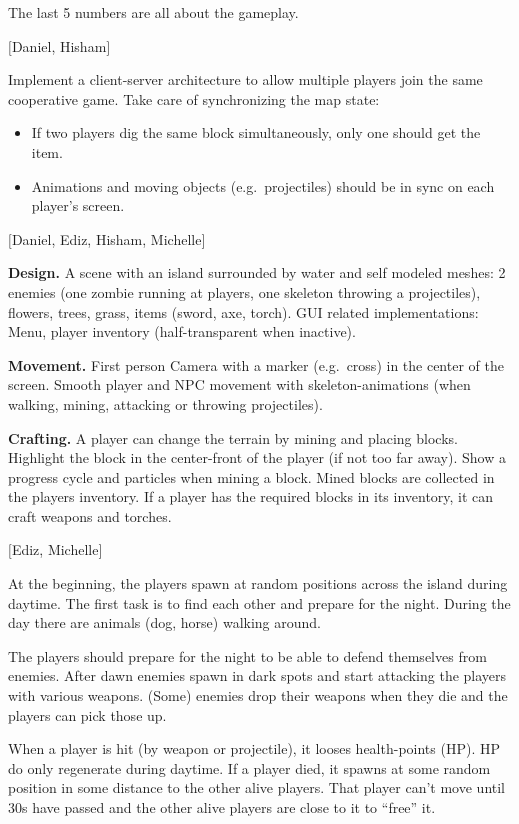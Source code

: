 \documentclass[A4paper]{gdv/gdv}
\newcommand{\teilaufgabe}[1]{\textbf{#1.}}
\begin{document}
\begin{gdvSheet}
The last 5 numbers are all about the gameplay.

$[$Daniel, Hisham$]$

Implement a client-server architecture to allow multiple players join the same cooperative game.
Take care of synchronizing the map state:

\begin{itemize}
	\item If two players dig the same block simultaneously, only one should get the item.
	\item Animations and moving objects (e.g.\ projectiles) should be in sync on each player's screen.
\end{itemize}

$[$Daniel, Ediz, Hisham, Michelle$]$

\teilaufgabe{Design}
A scene with an island surrounded by water and self modeled meshes: 2 enemies (one zombie running at players, one skeleton throwing a projectiles), flowers, trees, grass, items (sword, axe, torch).
GUI related implementations: Menu, player inventory (half-transparent when inactive).

\teilaufgabe{Movement}
First person Camera with a marker (e.g.\ cross) in the center of the screen.
Smooth player and NPC movement with skeleton-animations (when walking, mining, attacking or throwing projectiles).

\teilaufgabe{Crafting}
A player can change the terrain by mining and placing blocks.
Highlight the block in the center-front of the player (if not too far away).
Show a progress cycle and particles when mining a block.
Mined blocks are collected in the players inventory.
If a player has the required blocks in its inventory, it can craft weapons and torches.

$[$Ediz, Michelle$]$

At the beginning, the players spawn at random positions across the island during daytime.
The first task is to find each other and prepare for the night.
During the day there are animals (dog, horse) walking around.

The players should prepare for the night to be able to defend themselves from enemies.
After dawn enemies spawn in dark spots and start attacking the players with various weapons.
(Some) enemies drop their weapons when they die and the players can pick those up.

When a player is hit (by weapon or projectile), it looses health-points (HP).
HP do only regenerate during daytime.
If a player died, it spawns at some random position in some distance to the other alive players.
That player can't move until 30s have passed and the other alive players are close to it to \enquote{free} it.


\end{gdvSheet}
\end{document}
